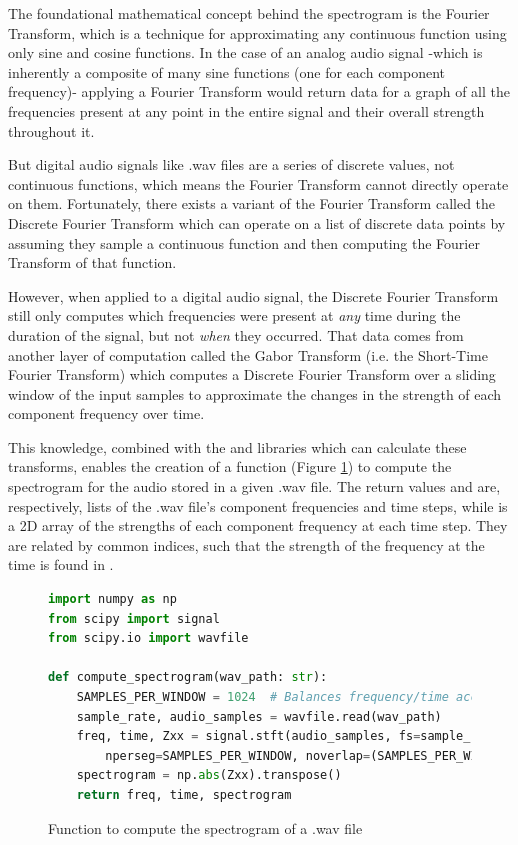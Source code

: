 The foundational mathematical concept behind the spectrogram is the
Fourier Transform, which is a technique for approximating any
continuous function using only sine and cosine functions. In the case
of an analog audio signal -which is inherently a composite of many sine
functions (one for each component frequency)- applying a Fourier
Transform would return data for a graph of all the frequencies present
at any point in the entire signal and their overall strength throughout
it.

But digital audio signals like .wav files are a series of discrete
values, not continuous functions, which means the Fourier Transform
cannot directly operate on them. Fortunately, there exists a variant of
the Fourier Transform called the Discrete Fourier Transform which can
operate on a list of discrete data points by assuming they sample a
continuous function and then computing the Fourier Transform of that
function.

However, when applied to a digital audio signal, the Discrete Fourier
Transform still only computes which frequencies were present at
\emph{any} time during the duration of the signal, but not \emph{when}
they occurred. That data comes from another layer of computation called
the Gabor Transform (i.e. the Short-Time Fourier Transform) which
computes a Discrete Fourier Transform over a sliding window of the
input samples to approximate the changes in the strength of each
component frequency over time.

This knowledge, combined with the  \cite{numpy} and
 \cite{scipy} libraries which can calculate these
transforms, enables the creation of a function (Figure
\ref{fig:code-compute-spectrogram}) to compute the spectrogram for the
audio stored in a given .wav file. The return values  and
 are, respectively, lists of the .wav file's component
frequencies and time steps, while  is a 2D array of
the strengths of each component frequency at each time step. They are
related by common indices, such that the strength of the frequency
 at the time  is found in
.

\begin{figure}[h]
\caption{Function to compute the spectrogram of a .wav file}
\label{fig:code-compute-spectrogram}
\begin{lstlisting}[language=Python]
import numpy as np
from scipy import signal
from scipy.io import wavfile

def compute_spectrogram(wav_path: str):
    SAMPLES_PER_WINDOW = 1024  # Balances frequency/time accuracy
    sample_rate, audio_samples = wavfile.read(wav_path)
    freq, time, Zxx = signal.stft(audio_samples, fs=sample_rate,
        nperseg=SAMPLES_PER_WINDOW, noverlap=(SAMPLES_PER_WINDOW // 4) * 3)
    spectrogram = np.abs(Zxx).transpose()
    return freq, time, spectrogram
\end{lstlisting}
\end{figure}

